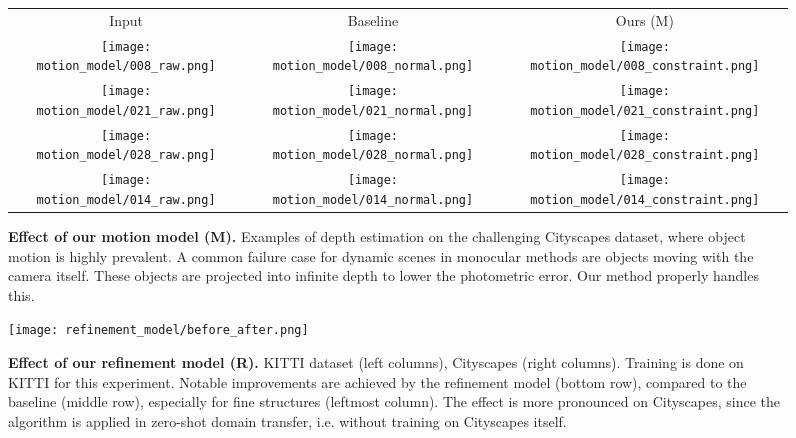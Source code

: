 \documentclass[letterpaper]{article} \usepackage{aaai19}  \usepackage{times}  \usepackage{helvet}  \usepackage{courier}  \usepackage{url}  \usepackage{graphicx}  \frenchspacing
\begin{document}
\begin{figure*}[t!]
\centering
\begin{tabular}{@{\hskip 1mm}c@{\hskip 1mm}c@{\hskip 1mm}c@{}}

\end{tabular}
\begin{tabular}{@{\hskip 1mm}c@{\hskip 1mm}c@{\hskip 1mm}c}
\small{Input} & \small{Baseline} & \small{Ours (M)}\\

\texttt{[image: motion\_model/008\_raw.png]} &
\texttt{[image: motion\_model/008\_normal.png]} &
\texttt{[image: motion\_model/008\_constraint.png]} \\

\texttt{[image: motion\_model/021\_raw.png]} &
\texttt{[image: motion\_model/021\_normal.png]} &
\texttt{[image: motion\_model/021\_constraint.png]} \\

\texttt{[image: motion\_model/028\_raw.png]} &
\texttt{[image: motion\_model/028\_normal.png]} &
\texttt{[image: motion\_model/028\_constraint.png]} \\
   
\texttt{[image: motion\_model/014\_raw.png]} &
\texttt{[image: motion\_model/014\_normal.png]} &
\texttt{[image: motion\_model/014\_constraint.png]} \\

\end{tabular}

    \caption{\textbf{Effect of our motion model (M).} Examples of depth estimation on the challenging Cityscapes dataset, where object motion is highly prevalent. A common failure case for dynamic scenes in monocular methods are objects moving with the camera itself. These objects are projected into infinite depth to lower the photometric error. Our method properly handles this.}
    \label{fig:forward_motion}
\end{figure*}

\begin{figure*} [h!]
    \centering
    \texttt{[image: refinement\_model/before\_after.png]}
    \caption{\textbf{Effect of our refinement model (R).} KITTI dataset (left columns), Cityscapes (right columns). Training is done on KITTI for this experiment. Notable improvements are achieved by the refinement model (bottom row), compared to the baseline (middle row), especially for fine structures (leftmost column). The effect is more pronounced on Cityscapes, since the algorithm is applied in zero-shot domain transfer, i.e. without training on Cityscapes itself. }
    \label{fig:kitti_refinement}
\end{figure*}
\end{document}
